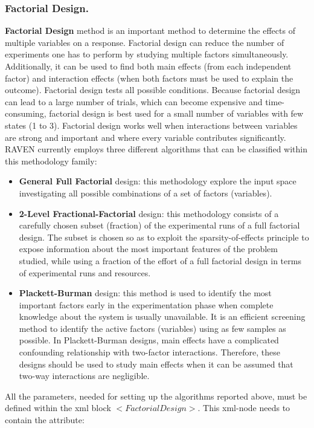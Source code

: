 \subsubsection{Factorial Design.}
\label{subsubsubsec:FactorialDOE}
\textbf{Factorial Design} method is an important method to determine the effects of multiple variables on a response. Factorial design can reduce the number of experiments one has to perform by studying multiple factors simultaneously. Additionally, it can be used to find both main effects (from each independent factor) and interaction effects (when both factors must be used to explain the outcome). 
Factorial design tests all possible conditions. Because factorial design can lead to a large number of trials, which can become expensive and time-consuming, factorial design is best used for a small number of variables with few states (1 to 3). Factorial design works well when interactions between variables are strong and important and where every variable contributes significantly. RAVEN currently  employs three different algorithms that can be classified within this methodology family:
\begin{itemize}
 \item \textbf{General Full Factorial} design: this methodology  explore the input space investigating  all possible combinations of a set of factors (variables).
 \item \textbf{2-Level Fractional-Factorial} design: this methodology consists of a carefully chosen subset (fraction) of the experimental runs of a full factorial design. The subset is chosen so as to exploit the sparsity-of-effects principle to expose information about the most important features of the problem studied, while using a fraction of the effort of a full factorial design in terms of experimental runs and resources.
\item \textbf{Plackett-Burman } design: this method is used to identify the most important factors early in the experimentation phase when complete knowledge about the system is usually unavailable. It is an efficient screening method to identify the active factors (variables) using as few samples as possible.
In Plackett-Burman designs, main effects have a complicated confounding relationship with two-factor interactions. Therefore, these designs should be used to study main effects when it can be assumed that two-way interactions are negligible.
\end{itemize}
All the parameters, needed for setting up the algorithms reported above, must be defined within the xml block $<FactorialDesign>$. This xml-node needs to contain the attribute:
